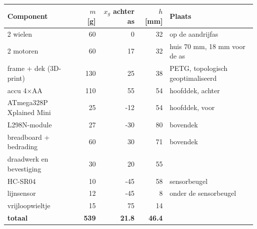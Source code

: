 \begin{tabular}{lrrrl}
\toprule
Component & $m$ [g] & $x_g$ achter as & $h$ [mm] & Plaats \\
\midrule
2 wielen & 60 & 0 & 32 & op de aandrijfas \\
2 motoren & 60 & 17 & 32 & huis 70 mm, 18 mm voor de as \\
frame + dek (3D-print) & 130 & 25 & 38 & PETG, topologisch geoptimaliseerd \\
accu 4$\times$AA & 110 & 55 & 54 & hoofddek, achter \\
ATmega328P Xplained Mini & 25 & -12 & 54 & hoofddek, voor \\
L298N-module & 27 & -30 & 80 & bovendek \\
breadboard + bedrading & 60 & 30 & 71 & bovendek \\
draadwerk en bevestiging & 30 & 20 & 55 &  \\
HC-SR04 & 10 & -45 & 58 & sensorbeugel \\
lijnsensor & 12 & -45 & 8 & onder de sensorbeugel \\
vrijloopwieltje & 15 & 75 & 14 &  \\
\midrule
\textbf{totaal} & \textbf{539} & \textbf{21.8} & \textbf{46.4} & \\
\bottomrule
\end{tabular}
